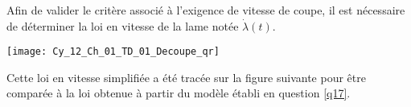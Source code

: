 Afin de valider le critère associé à l’exigence de vitesse de coupe, il est nécessaire de déterminer la
loi en vitesse de la lame notée $\dot{\lambda}(t)$.


\ifprof
\else
\begin{marginfigure}
\centering
\texttt{[image: Cy\_12\_Ch\_01\_TD\_01\_Decoupe\_qr]}
\end{marginfigure}
\fi

\ifprof
\begin{corrige}
\end{corrige}
\else
\fi

Cette loi en vitesse simplifiée a été tracée sur la figure suivante pour être comparée à la loi obtenue à
partir du modèle établi en question \ref{q17}.



\ifprof
\begin{corrige}
\end{corrige}
\else
\fi
